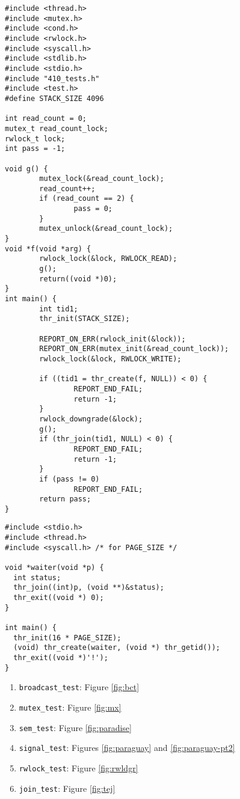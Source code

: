 \documentclass[pldi]{../sigplanconf-pldi15}
\begin{document}
\begin{figure*}
\begin{verbatim}
#include <thread.h>
#include <mutex.h>
#include <cond.h>
#include <rwlock.h>
#include <syscall.h>
#include <stdlib.h>
#include <stdio.h>
#include "410_tests.h"
#include <test.h>
#define STACK_SIZE 4096

int read_count = 0;
mutex_t read_count_lock;
rwlock_t lock;
int pass = -1; 

void g() {
        mutex_lock(&read_count_lock);
        read_count++;
        if (read_count == 2) {
                pass = 0;
        }   
        mutex_unlock(&read_count_lock);
}
void *f(void *arg) {
        rwlock_lock(&lock, RWLOCK_READ);
        g();
        return((void *)0);
}
int main() {
        int tid1;
        thr_init(STACK_SIZE);

        REPORT_ON_ERR(rwlock_init(&lock));
        REPORT_ON_ERR(mutex_init(&read_count_lock));
        rwlock_lock(&lock, RWLOCK_WRITE);

        if ((tid1 = thr_create(f, NULL)) < 0) {
                REPORT_END_FAIL;
                return -1; 
        }   
        rwlock_downgrade(&lock);
        g();
        if (thr_join(tid1, NULL) < 0) {
                REPORT_END_FAIL;
                return -1;
        }
        if (pass != 0)
                REPORT_END_FAIL;
        return pass;
}
\end{verbatim}
	\caption{{\tt rwlock\_test},
	a test of all {\tt rwlock} functions.}
	\label{fig:rwldgr}
\end{figure*}
\begin{figure*}
\begin{verbatim}
#include <stdio.h>
#include <thread.h>
#include <syscall.h> /* for PAGE_SIZE */

void *waiter(void *p) {
  int status;
  thr_join((int)p, (void **)&status);
  thr_exit((void *) 0); 
}

int main() {
  thr_init(16 * PAGE_SIZE);
  (void) thr_create(waiter, (void *) thr_getid());
  thr_exit((void *)'!');
}
\end{verbatim}
	\caption{{\tt join\_test},
	a test of {\tt thr\_create}, {\tt thr\_exit}, and {\tt thr\_join}.}
	\label{fig:tej}
\end{figure*}

\begin{enumerate}
	\item {\tt broadcast\_test}: Figure \ref{fig:bct}
	\item {\tt mutex\_test}: Figure \ref{fig:mx}
	\item {\tt sem\_test}: Figure \ref{fig:paradise}
	\item {\tt signal\_test}: Figures \ref{fig:paraguay} and \ref{fig:paraguay-pt2}
	\item {\tt rwlock\_test}: Figure \ref{fig:rwldgr}
	\item {\tt join\_test}: Figure \ref{fig:tej}
\end{enumerate}
\end{document}
